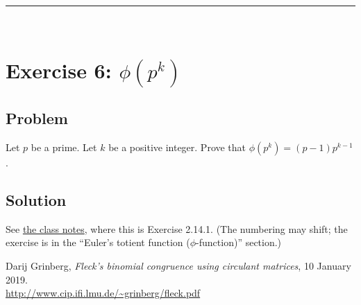 \documentclass[paper=a4, fontsize=12pt]{scrartcl} %
\newcommand{\tup}[1]{\left( #1 \right)}
\newcommand{\horrule}[1]{\rule{\linewidth}{#1}} %
\theoremstyle{plainsl}
\theoremstyle{definition}
\theoremstyle{remark}
\begin{document}
\horrule{0.3pt} \\[0.4cm]

\section{Exercise 6: $\phi\tup{p^k}$}

\subsection{Problem}

Let $p$ be a prime.
Let $k$ be a positive integer.
Prove that $\phi\tup{p^k} = \tup{p-1} p^{k-1}$.

\subsection{Solution}

See
\href{http://www-users.math.umn.edu/~dgrinber/19s/notes.pdf}{the class notes},
where this is Exercise 2.14.1.
(The numbering may shift; the exercise is in the
``Euler's totient function ($\phi$-function)''
section.)

\begin{thebibliography}{99999999}                                                                                         %



Darij Grinberg,
\textit{Fleck's binomial congruence using
circulant matrices},
10 January 2019. \\
\url{http://www.cip.ifi.lmu.de/~grinberg/fleck.pdf}

\end{thebibliography}
\end{document}
